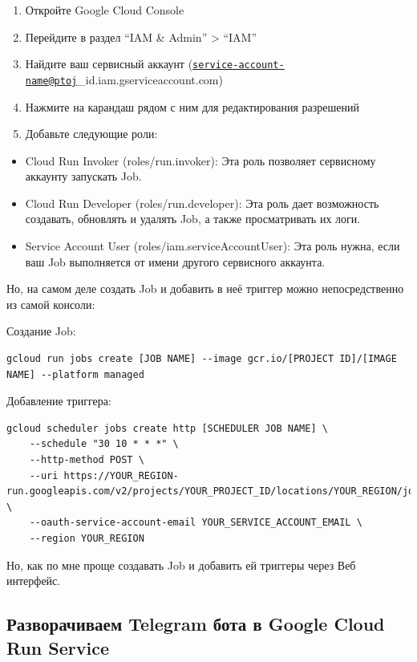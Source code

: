 \documentclass[
]{book}
\providecommand{\tightlist}{%
  \setlength{\itemsep}{0pt}\setlength{\parskip}{0pt}}
\begin{document}
\begin{enumerate}
\def\labelenumi{\arabic{enumi}.}
\tightlist
\item
  Откройте Google Cloud Console
\item
  Перейдите в раздел ``IAM \& Admin'' \textgreater{} ``IAM''
\item
  Найдите ваш сервисный аккаунт (\href{mailto:service-account-name@ptoj}{\nolinkurl{service-account-name@ptoj}}\_id.iam.gserviceaccount.com)
\item
  Нажмите на карандаш рядом с ним для редактирования разрешений
\item
  Добавьте следующие роли:
\end{enumerate}

\begin{itemize}
\tightlist
\item
  Cloud Run Invoker (roles/run.invoker): Эта роль позволяет сервисному аккаунту запускать Job.
\item
  Cloud Run Developer (roles/run.developer): Эта роль дает возможность создавать, обновлять и удалять Job, а также просматривать их логи.
\item
  Service Account User (roles/iam.serviceAccountUser): Эта роль нужна, если ваш Job выполняется от имени другого сервисного аккаунта.
\end{itemize}

Но, на самом деле создать Job и добавить в неё триггер можно непосредственно из самой консоли:

Создание Job:

\begin{verbatim}
gcloud run jobs create [JOB NAME] --image gcr.io/[PROJECT ID]/[IMAGE NAME] --platform managed
\end{verbatim}

Добавление триггера:

\begin{verbatim}
gcloud scheduler jobs create http [SCHEDULER JOB NAME] \
    --schedule "30 10 * * *" \
    --http-method POST \
    --uri https://YOUR_REGION-run.googleapis.com/v2/projects/YOUR_PROJECT_ID/locations/YOUR_REGION/jobs/YOUR_JOB_NAME:run \
    --oauth-service-account-email YOUR_SERVICE_ACCOUNT_EMAIL \
    --region YOUR_REGION
\end{verbatim}

Но, как по мне проще создавать Job и добавить ей триггеры через Веб интерфейс.

\subsection{Разворачиваем Telegram бота в Google Cloud Run Service}\label{ux440ux430ux437ux432ux43eux440ux430ux447ux438ux432ux430ux435ux43c-telegram-ux431ux43eux442ux430-ux432-google-cloud-run-service}
\end{document}
